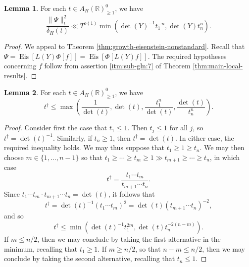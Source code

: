 \documentclass[reqno]{amsart}
\DeclareMathOperator{\Eis}{Eis}
\theoremstyle{plain} \newtheorem{theorem} {Theorem}
\theoremstyle{definition} \newtheorem{definition} [theorem] {Definition}
\theoremstyle{itplain} %
\newtheorem{lemma}[theorem]{Lemma}
\numberwithin{equation}{section}
\numberwithin{theorem}{section}
\renewcommand{\geq}{\geqslant}
\renewcommand{\leq}{\leqslant}
\begin{document}
\begin{lemma}\label{lem:standard2:we-have-begin-1-growth}
  For each $t \in A_H(\mathbb{R})^0_{\geq 1}$, we have
  \begin{equation}\label{eq:fracpsi-_r2d-ll}
    \frac{\|\Psi\|_t^2}{\delta_H(t)}  \ll T^{o(1)} \min \left( \det(Y)^{-1} t_1^{-n}, \det(Y) t_n^n \right).
  \end{equation}
\end{lemma}
\begin{proof}
  We appeal to Theorem \ref{thm:growth-eisenstein-nonstandard}.  Recall that $\Psi = \Eis[L(Y) \Phi[f]] = \Eis[\Phi[L(Y) f]]$.  The required hypotheses concerning $f$ follow from assertion \eqref{itm:sub-gln:7} of Theorem \ref{thm:main-local-results}.
\end{proof}

\begin{lemma}\label{lem:standard:any-dominant-element}
  For each $t \in A_H(\mathbb{R})^0_{\geq 1}$, we have
  \begin{equation*}
    t ^\dagger \leq \max\left( \frac{1}{\det(t)}, \det(t), \frac{t_1^n}{\det(t)}, \frac{\det(t)}{ t_n^{n}} \right).
\end{equation*}
\end{lemma}
\begin{proof}
  Consider first the case that $t_1 \leq 1$.  Then $t_j \leq 1$ for all $j$, so $t ^\dagger = \det(t)^{-1}$.  Similarly, if $t_n \geq 1$, then $t ^\dagger = \det(t)$.  In either case, the required inequality holds.  We may thus suppose that $t_1 \geq 1 \geq t_n$.  We may then choose $m \in \{1, \dotsc, n-1\}$ so that $t_1 \geq \dotsb \geq t_m \geq 1 \gg t_{m+1} \geq \dotsb \geq t_n$, in which case
  \begin{equation*}
    t ^\dagger = \frac{t_1 \dotsb t_m}{t_{m+1} \dotsb t_n}.
  \end{equation*}
  Since $t_1 \dotsb t_m \cdot t_{m+1} \dotsb t_n = \det(t)$, it follows that
  \begin{equation*}
    t ^\dagger = \det(t)^{-1} (t _1 \dotsb t _m ) ^2 = \det(t) (t _{m + 1 } \dotsb t _n ) ^{- 2},
  \end{equation*}
  and so
  \begin{equation*}
    t ^\dagger \leq \min(\det(t)^{-1} t_1^{2 m},  \det(t) t_n^{-2(n-m)}).
  \end{equation*}
  If $m \leq n/2$, then we may conclude by taking the first alternative in the minimum, recalling that $t_1 \geq 1$.  If $m \geq n/2$, so that $n-m \leq n/2$, then we may conclude by taking the second alternative, recalling that $t_n \leq 1$.
\end{proof}
\end{document}
